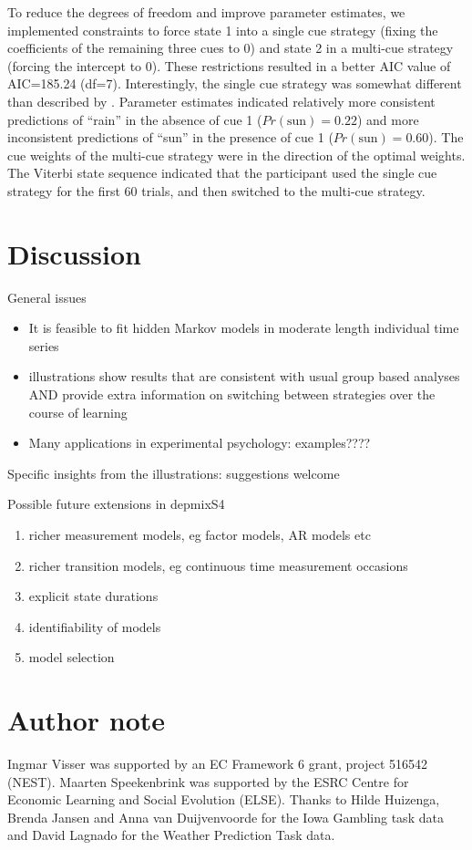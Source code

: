 \documentclass[a4paper,12pt,man,english]{apa} %
\newcommand{\citet}{\citeA}
\begin{document}
To reduce the degrees of freedom and improve parameter estimates, we
implemented constraints to force state 1 into a single cue strategy
(fixing the coefficients of the remaining three cues to 0) and state 2
in a multi-cue strategy (forcing the intercept to 0).  These
restrictions resulted in a better AIC value of AIC=185.24 (df=7).
Interestingly, the single cue strategy was somewhat different than
described by \citet{Gluck2002}.  Parameter estimates indicated relatively
more consistent predictions of ``rain'' in the absence of cue 1
($Pr(\text{sun}) = 0.22$) and more inconsistent predictions of ``sun''
in the presence of cue 1 ($Pr(\text{sun}) = 0.60$).  The cue weights
of the multi-cue strategy were in the direction of the optimal
weights.  The Viterbi state sequence indicated that the participant
used the single cue strategy for the first 60 trials, and then
switched to the multi-cue strategy.


\section{Discussion}

General issues
\begin{itemize}
	\item It is feasible to fit hidden Markov models in moderate length individual time series
	\item illustrations show results that are consistent with usual group based analyses AND 
	provide extra information on switching between strategies over the course of learning
	\item Many applications in experimental psychology: examples????
\end{itemize}

Specific insights from the illustrations: suggestions welcome

Possible future extensions in depmixS4
\begin{enumerate}
	\item richer measurement models, eg factor models, AR models etc
	\item richer transition models, eg continuous time measurement occasions
	\item explicit state durations
	\item identifiability of models
	\item model selection
\end{enumerate}





\section*{Author note}

Ingmar Visser was supported by an EC Framework 6 grant, project 516542
(NEST).  Maarten Speekenbrink was supported by the ESRC Centre for
Economic Learning and Social Evolution (ELSE).  Thanks to Hilde
Huizenga, Brenda Jansen and Anna van Duijvenvoorde for the Iowa
Gambling task data and David Lagnado for the Weather Prediction Task
data.


\end{document}
